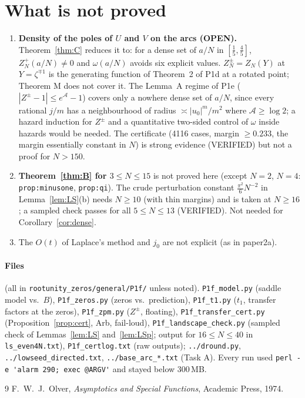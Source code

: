 \documentclass[11pt]{article}
\theoremstyle{definition}\newtheorem{definition}[theorem]{Definition}
\theoremstyle{remark}\newtheorem{remark}[theorem]{Remark}
\begin{document}
\section{What is not proved}\label{sec:open}
\begin{enumerate}
\item \textbf{Density of the poles of $U$ and $V$ on the arcs (OPEN).} Theorem~\ref{thm:C} reduces it to: for a dense set of $a/N$ in $[\frac15,\frac45]$, $Z^+_N(a/N)\ne0$ and $\omega(a/N)$ avoids six explicit values. $Z^\pm_N=Z_N(Y)$ at $Y=\zeta^{\mp1}$ is the generating function of Theorem~2 of P1d at a rotated point; Theorem M does not cover it. The Lemma~A regime of P1e ($|Z^\pm-1|\le e^{\mathcal A}-1$) covers only a nowhere dense set of $a/N$, since every rational $j/m$ has a neighbourhood of radius $\asymp|u_0|^m/m^2$ where $\mathcal A\ge\log2$; a hazard induction for $Z^\pm$ and a quantitative two-sided control of $\omega$ inside hazards would be needed. The certificate (4116 cases, margin $\ge0.233$, the margin essentially constant in $N$) is strong evidence (VERIFIED) but not a proof for $N>150$.
\item \textbf{Theorem~\ref{thm:B} for $3\le N\le15$} is not proved here (except $N=2$, $N=4$: \texttt{prop:minusone}, \texttt{prop:qi}). The crude perturbation constant $\frac{\pi^2}6N^{-2}$ in Lemma~\ref{lem:LS}(b) needs $N\ge10$ (with thin margins) and is taken at $N\ge16$; a sampled check passes for all $5\le N\le13$ (VERIFIED). Not needed for Corollary~\ref{cor:dense}.
\item The $O(t)$ of Laplace's method and $j_0$ are not explicit (as in paper2a).
\end{enumerate}

\paragraph{Files} (all in \texttt{rootunity\_zeros/general/P1f/} unless noted). \texttt{P1f\_model.py} (saddle model vs.\ $B$), \texttt{P1f\_zeros.py} (zeros vs.\ prediction), \texttt{P1f\_t1.py} ($t_1$, transfer factors at the zeros), \texttt{P1f\_zpm.py} ($Z^\pm$, floating), \texttt{P1f\_transfer\_cert.py} (Proposition~\ref{prop:cert}, Arb, fail-loud), \texttt{P1f\_landscape\_check.py} (sampled check of Lemmas~\ref{lem:LS} and~\ref{lem:LSp}; output for $16\le N\le40$ in \texttt{ls\_even4N.txt}), \texttt{P1f\_certlog.txt} (raw outputs); \texttt{../dround.py}, \texttt{../lowseed\_directed.txt}, \texttt{../base\_arc\_*.txt} (Task A). Every run used \verb|perl -e 'alarm 290; exec @ARGV'| and stayed below 300\,MB.

\begin{thebibliography}{9}
 F.~W.~J.~Olver, \emph{Asymptotics and Special Functions}, Academic Press, 1974.
\end{thebibliography}
\end{document}
